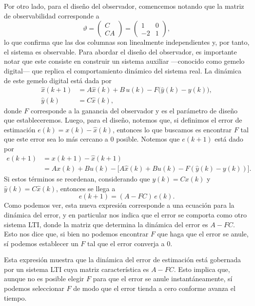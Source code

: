 \documentclass[
  11pt,
  letterpaper,
   addpoints,
  answers
  ]{exam}
\begin{document}
\begin{questions}
\begin{solution}
Por otro lado, para el diseño del observador, comencemos notando que la matriz de observabilidad corresponde a
\begin{equation}
\vartheta=\begin{pmatrix}C\\ CA\end{pmatrix}=
\begin{pmatrix}
1 & 0\\
-2 & 1
\end{pmatrix},
\end{equation}
lo que confirma que las dos columnas son linealmente independientes y, por tanto, el sistema es observable. Para abordar el diseño del observador, es importante notar que este consiste en construir un sistema auxiliar —conocido como gemelo digital— que replica el comportamiento dinámico del sistema real. La dinámica de este gemelo digital está dada por
\begin{align}
\hat{x}(k+1)&=A\hat{x}(k)+B\,u(k)-F\big(\hat{y}(k)-y(k)\big),\\
\hat{y}(k)&=C\hat{x}(k),
\end{align}
donde $F$ corresponde a la ganancia del observador y es el parámetro de diseño que estableceremos. Luego, para el diseño, notemos que, si definimos el error de estimación $e(k)=x(k)-\hat{x}(k)$, entonces lo que buscamos es encontrar $F$ tal que este error sea lo más cercano a $0$ posible. Notemos que $e(k+1)$ está dado por
\begin{align}
e(k+1)&=x(k+1)-\hat{x}(k+1)\\
&=Ax(k)+Bu(k)-\big[A\hat{x}(k)+Bu(k)-F(\hat{y}(k)-y(k))\big].
\end{align}
Si estos términos se reordenan, considerando que $y(k)=Cx(k)$ y $\hat{y}(k)=C\hat{x}(k)$, entonces se llega a
\begin{equation}
e(k+1)=(A-FC)\,e(k).
\end{equation}
Como podemos ver, esta nueva expresión corresponde a una ecuación para la dinámica del error, y en particular nos indica que el error se comporta como otro sistema LTI, donde la matriz que determina la dinámica del error es $A-FC$. Esto nos dice que, si bien no podemos encontrar $F$ que haga que el error se anule, sí podemos establecer un $F$ tal que el error converja a $0$.

Esta expresión muestra que la dinámica del error de estimación está gobernada por un sistema LTI cuya matriz característica es $A-FC$. Esto implica que, aunque no es posible elegir $F$ para que el error se anule instantáneamente, sí podemos seleccionar $F$ de modo que el error tienda a cero conforme avanza el tiempo.


\end{solution}
\end{questions}
\end{document}

